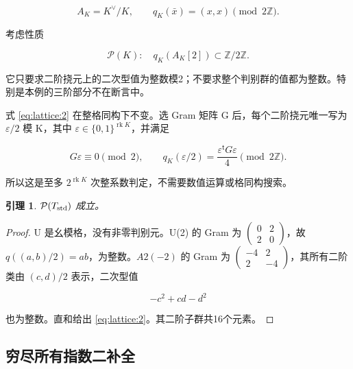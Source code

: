 \documentclass[11pt,a4paper,oneside]{ctexart}
\theoremstyle{cnplain}
\newtheorem{lemma}[theorem]{引理}
\theoremstyle{definition}
\theoremstyle{remark}
\numberwithin{equation}{section}
\begin{document}
\begin{equation}
A_K=K^\vee/K,\qquad
 q_K(\bar x)=(x,x)\pmod{2\mathbb Z}.
\end{equation}

考虑性质

\begin{equation}
\mathcal P(K):\quad q_K(A_K[2])\subset\mathbb Z/2\mathbb Z.       \label{eq:lattice:2}
\end{equation}

它只要求二阶挠元上的二次型值为整数模2；不要求整个判别群的值都为整数。特别是本例的三阶部分不在断言中。

式 \eqref{eq:lattice:2} 在整格同构下不变。选 Gram 矩阵 G 后，每个二阶挠元唯一写为 \(\varepsilon/2\) 模 K，其中 \(\varepsilon\in\{0,1\}^{\operatorname{rk}K}\)，并满足

\begin{equation}
G\varepsilon\equiv0\pmod2,\qquad
 q_K(\varepsilon/2)=\frac{\varepsilon^{\mathsf t}G\varepsilon}{4}
                      \pmod{2\mathbb Z}.                         \label{eq:lattice:3}
\end{equation}

所以这是至多 \(2^{\operatorname{rk}K}\) 次整系数判定，不需要数值运算或格同构搜索。

\begin{lemma}

\(\mathcal P(T_{\rm std})\) 成立。

\end{lemma}

\begin{proof}

U 是幺模格，没有非零判别元。U(2) 的 Gram 为 \(\left(\begin{smallmatrix}0&2\\2&0\end{smallmatrix}\right)\)，故 \(q((a,b)/2)=ab\)，为整数。\(A2(- 2)\) 的 Gram 为 \(\left(\begin{smallmatrix}-4&2\\2&-4\end{smallmatrix}\right)\)，其所有二阶类由 \((c,d)/2\) 表示，二次型值

\begin{equation}
-c^2+cd-d^2
\end{equation}

也为整数。直和给出 \eqref{eq:lattice:2}。其二阶子群共16个元素。

\end{proof}


\subsection{穷尽所有指数二补全}\label{sec:lattice:3}
\end{document}
